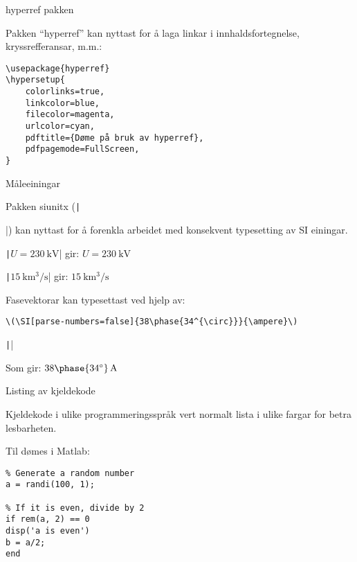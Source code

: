 	\begin{frame}[containsverbatim]{hyperref pakken}
	
	Pakken ``hyperref'' kan nyttast for å laga linkar i innhaldsfortegnelse, kryssrefferansar, m.m.:
	
	\begin{verbatim}
\usepackage{hyperref}
\hypersetup{
	colorlinks=true,
	linkcolor=blue,
	filecolor=magenta,      
	urlcolor=cyan,
	pdftitle={Døme på bruk av hyperref},
	pdfpagemode=FullScreen,
}
	\end{verbatim}

\end{frame}





\begin{frame}[containsverbatim]{Måleeiningar}
	
	Pakken siunitx (\texttt|\usepackage{siunitx}|) kan nyttast for å forenkla arbeidet med konsekvent typesetting av SI einingar.
	
	\texttt|\(U = \SI{230}{\kilo\volt}\)| gir: \(U = \SI{230}{\kilo\volt}\)
	
	\texttt|\(\SI{15}{\kilo\meter\cubed\per\second}\)| gir: \(\SI{15}{\kilo\meter\cubed\per\second}\)
	
	Fasevektorar kan typesettast ved hjelp av:
	\begin{verbatim}
\(\SI[parse-numbers=false]{38\phase{34^{\circ}}}{\ampere}\)
	\end{verbatim}
	\texttt||
	
	Som gir: \( \SI[parse-numbers=false]{38\phase{34^{\circ}}}{\ampere}\)
	
\end{frame}




\begin{frame}[containsverbatim]{Listing av kjeldekode}
	
	Kjeldekode i ulike programmeringsspråk vert normalt lista i ulike fargar for betra lesbarheten.
	
	Til dømes i Matlab:
	
	\begin{verbatim}
% Generate a random number
a = randi(100, 1);

% If it is even, divide by 2
if rem(a, 2) == 0
disp('a is even')
b = a/2;
end
	\end{verbatim}
	
\end{frame}




